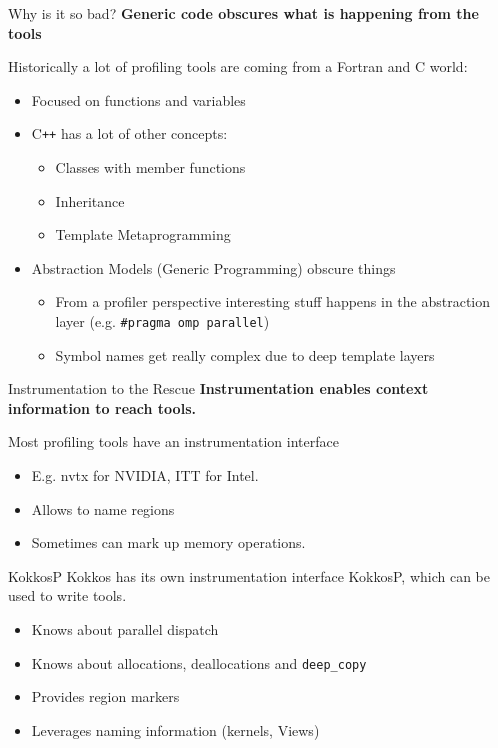 \begin{frame}[fragile]{Why is it so bad?}
  \textbf{Generic code obscures what is happening from the tools}

  Historically a lot of profiling tools are coming from a Fortran and C world:

  \begin{itemize}
    \item Focused on functions and variables
    \item C\texttt{++} has a lot of other concepts:
    \begin{itemize}
      \item Classes with member functions
      \item Inheritance
      \item Template Metaprogramming
    \end{itemize}
    \item Abstraction Models (Generic Programming) obscure things
    \begin{itemize}
      \item From a profiler perspective interesting stuff happens in the abstraction layer (e.g. \texttt{\#pragma omp parallel})
      \item Symbol names get really complex due to deep template layers  
    \end{itemize}
  \end{itemize}

\end{frame}


\begin{frame}[fragile]{Instrumentation to the Rescue}
  \textbf{Instrumentation enables context information to reach tools.}

  \vspace{5pt}
  Most profiling tools have an instrumentation interface

  \begin{itemize}
    \item E.g. nvtx for NVIDIA, ITT for Intel.
    \item Allows to name regions
    \item Sometimes can mark up memory operations.
  \end{itemize}

  \pause
  \vspace{5pt}
  \begin{block}{KokkosP}
    Kokkos has its own instrumentation interface KokkosP, which can be used to write tools.
  \end{block}

  \begin{itemize}
    \item Knows about parallel dispatch
    \item Knows about allocations, deallocations and \texttt{deep\_copy}
    \item Provides region markers
    \item Leverages naming information (kernels, Views)
  \end{itemize}

\end{frame}

